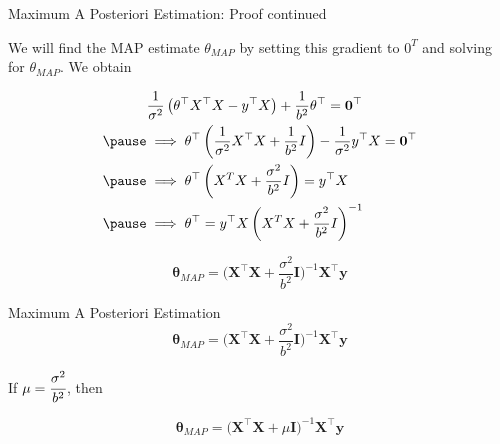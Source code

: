 \documentclass{beamer}
\begin{document}
\begin{frame}{Maximum A Posteriori Estimation: Proof continued}


We will find the MAP estimate $\theta_{MAP}$ by setting this gradient to $0^{T}$ and solving for $\theta_{MAP}$. We obtain

\begin{equation*}
\begin{aligned}
&\frac{1}{\sigma^{2}}\left({\theta}^{\top} {X}^{\top} {X}-{y}^{\top} {X}\right)+\frac{1}{b^{2}} {\theta}^{\top}=\mathbf{0}^{\top}\\
\pause
&\implies {\theta}^{\top}\left(\frac{1}{\sigma^{2}} {X}^{\top} {X}+\frac{1}{b^{2}} {I}\right)-\frac{1}{\sigma^{2}} {y}^{\top} {X}=\mathbf{0}^{\top}\\
\pause
&\implies {\theta}^{\top}\left(X^{T}X+\frac{\sigma^{2}}{b^{2}} {I}\right)={y}^{\top} {X}\\
\pause
&\implies {\theta}^{\top}={y}^{\top} X\left(X^{T}X+\frac{\sigma^{2}}{b^{2}} {I}\right)^{-1}
\end{aligned}
\end{equation*}

\begin{equation*}
\boldsymbol{\theta}_{MAP} = \big(\boldsymbol{X^{\top}X} + \frac{\sigma^{2}}{b^{2}}\boldsymbol{I}\big)^{-1}\boldsymbol{X}^{\top}\boldsymbol{y}
\end{equation*}

\end{frame}


\begin{frame}{Maximum A Posteriori Estimation}
\begin{equation*}
\boldsymbol{\theta}_{MAP} = \big(\boldsymbol{X^{\top}X} + \frac{\sigma^{2}}{b^{2}}\boldsymbol{I}\big)^{-1}\boldsymbol{X}^{\top}\boldsymbol{y}
\end{equation*}

If $\mu = \cfrac{\sigma^{2}}{b^{2}}$, then

\begin{equation*}
\boldsymbol{\theta}_{MAP} = \big(\boldsymbol{X^{\top}X} + \mu \boldsymbol{I}\big)^{-1}\boldsymbol{X}^{\top}\boldsymbol{y}
\end{equation*}


\end{frame}
\end{document}
